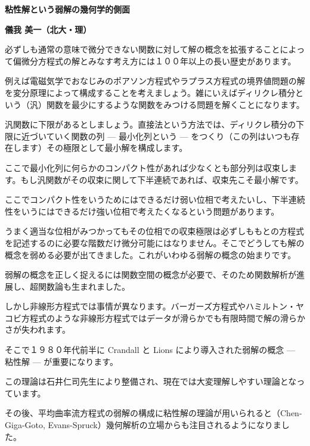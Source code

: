 \documentclass[uplatex,dvipdfmx]{jlreq}
\begin{document}
\newpage

\begin{center}
{\large\bfseries 粘性解という弱解の幾何学的側面}
\end{center}

\begin{flushright}
\textbf{儀我 美一（北大・理）}
\end{flushright}

必ずしも通常の意味で微分できない関数に対して解の概念を拡張することによって偏微分方程式の解とみなす考え方には１００年以上の長い歴史があります。

例えば電磁気学でおなじみのポアソン方程式やラプラス方程式の境界値問題の解を変分原理によって構成することを考えましょう。雑にいえばディリクレ積分という（汎）関数を最少にするような関数をみつける問題を解くことになります。

汎関数に下限があるとしましょう。直接法という方法では、ディリクレ積分の下限に近づいていく関数の列 --- 最小化列という --- をつくり（この列はいつも存在します）その極限として最小解を構成します。

ここで最小化列に何らかのコンパクト性があれば少なくとも部分列は収束します。もし汎関数がその収束に関して下半連続であれば、収束先こそ最小解です。

ここでコンパクト性をいうためにはできるだけ弱い位相で考えたいし、下半連続性をいうにはできるだけ強い位相で考えたくなるという問題があります。

うまく適当な位相がみつかってもその位相での収束極限は必ずしももとの方程式を記述するのに必要な階数だけ微分可能にはなりません。そこでどうしても解の概念を弱める必要が出てきました。これがいわゆる弱解の概念の始まりです。

弱解の概念を正しく捉えるには関数空間の概念が必要で、そのため関数解析が進展し、超関数論も生まれました。

しかし非線形方程式では事情が異なります。バーガーズ方程式やハミルトン・ヤコビ方程式のような非線形方程式ではデータが滑らかでも有限時間で解の滑らかさが失われます。

そこで１９８０年代前半に Crandall と Lions により導入された弱解の概念 --- 粘性解 --- が重要になります。

この理論は石井仁司先生により整備され、現在では大変理解しやすい理論となっています。

その後、平均曲率流方程式の弱解の構成に粘性解の理論が用いられると（Chen-Giga-Goto, Evans-Spruck）幾何解析の立場からも注目されるようになりました。
\end{document}

